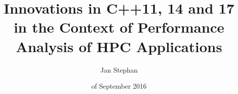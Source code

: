\documentclass[utf8,hauptseminar]{zihpub}
\date{\ordinalnum{30} of September 2016}
\author{Jan Stephan}
\title{Innovations in C++11, 14 and 17 in the Context of Performance Analysis of HPC Applications}
\begin{document}



%




{}

\end{document}
